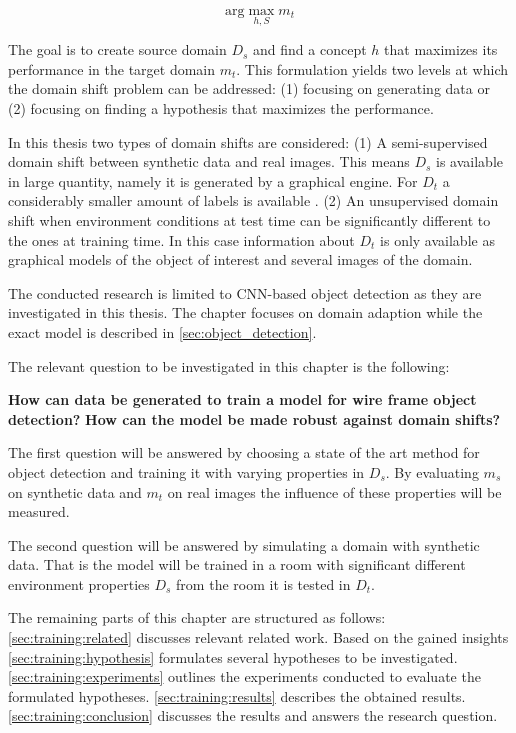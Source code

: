 $$
\text{arg}\max\limits_{h,S} m_t
$$

The goal is to create source domain $D_s$ and find a concept $h$ that maximizes its performance in the target domain $m_t$. This formulation yields two levels at which the domain shift problem can be addressed: (1) focusing on generating data or (2) focusing on finding a hypothesis that maximizes the performance.

In this thesis two types of domain shifts are considered: (1) A semi-supervised domain shift between synthetic data and real images. This means $D_s$ is available in large quantity, namely it is generated by a graphical engine. For $D_t$ a considerably smaller amount of labels is available . 
(2) An unsupervised domain shift when environment conditions at test time can be significantly different to the ones at training time. In this case information about $D_t$ is only available as graphical models of the object of interest and several images of the domain. 

The conducted research is limited to \ac{CNN}-based object detection as they are investigated in this thesis. The chapter focuses on domain adaption while the exact model is described in \autoref{sec:object_detection}.

The relevant question to be investigated in this chapter is the following:

\begin{center}
	\textbf{How can data be generated to train a model for wire frame object detection?}
	\textbf{How can the model be made robust against domain shifts?}
\end{center}

The first question will be answered by choosing a state of the art method for object detection and training it with varying properties in $D_s$. By evaluating $m_s$ on synthetic data and $m_t$ on real images the influence of these properties will be measured.  

The second question will be answered by simulating a domain with synthetic data. That is the model will be trained in a room with significant different environment properties $D_s$ from the room it is tested in $D_t$.

The remaining parts of this chapter are structured as follows: \autoref{sec:training:related} discusses relevant related work. Based on the gained insights \autoref{sec:training:hypothesis} formulates several hypotheses to be investigated. \autoref{sec:training:experiments} outlines the experiments conducted to evaluate the formulated hypotheses. \autoref{sec:training:results} describes the obtained results. \autoref{sec:training:conclusion} discusses the results and answers the research question.

